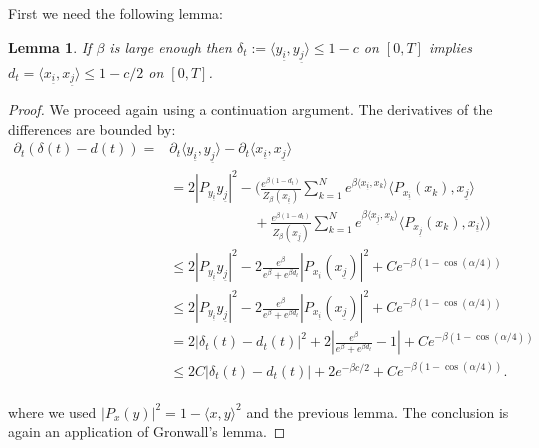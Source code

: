 \documentclass{article}
\numberwithin{theorem}{section}
\newtheorem{lemma}[theorem]{Lemma}
\begin{document}
First we need the following lemma:
\begin{lemma}
 If $\beta$ is large enough then $\delta_t:=\langle y_{\underline{i}},y_{\underline{j}}\rangle \leq 1-c$ on $[0,T]$ implies $d_t=\langle x_{\underline{i}},x_{\underline{j}}\rangle\leq  1-c/2$ on $[0,T]$.
\end{lemma}
\begin{proof}
We proceed again using a continuation argument. The derivatives of the differences are bounded by:
\begin{align*}
\partial_t (\delta(t) - d(t)) = &\partial_t \langle y_{\underline{i}},y_{\underline{j}}\rangle - \partial_t \langle x_{\underline{i}},x_{\underline{j}}\rangle \\
&=2|P_{y_{\underline{i}}}y_{\underline{j}}|^2 - \Big(\frac{e^{\beta(1-d_t)}}{Z_\beta(x_{\underline{i}})}\sum_{k=1}^N e^{\beta\langle x_{\underline{i}}, x_k\rangle}  \langle P_{x_{\underline{i}}}(x_k), x_{\underline{j}}\rangle \\
& \qquad \qquad \qquad + \frac{e^{\beta(1-d_t)}}{Z_\beta(x_{\underline{j}})}\sum_{k=1}^N e^{\beta\langle x_{\underline{j}}, x_k\rangle}  \langle P_{x_{\underline{j}}}(x_k), x_{\underline{i}}\rangle\Big) \\
&\leq 2|P_{y_{\underline{i}}}y_{\underline{j}}|^2 - 2\frac{e^\beta}{e^\beta + e^{\beta d_t}}|{P_{x_{\underline{i}}}}(x_{\underline{j}})|^2 + Ce^{-\beta(1-\cos(\alpha/4))} \\
&\leq 2|P_{y_{\underline{i}}}y_{\underline{j}}|^2 - 2\frac{e^\beta}{e^\beta + e^{\beta d_t}}|{P_{x_{\underline{i}}}}(x_{\underline{j}})|^2 + Ce^{-\beta(1-\cos(\alpha/4))} \\
&= 2|\delta_t(t)-d_t(t)|^2 + 2|\frac{e^\beta}{e^\beta + e^{\beta d_t}}-1|+ Ce^{-\beta(1-\cos(\alpha/4))} \\
&\leq 2C|\delta_t(t)-d_t(t)| + 2e^{-\beta c/2}+ Ce^{-\beta(1-\cos(\alpha/4))}.\\
\end{align*}

where we used $|P_x(y)|^2 = 1 - \langle x,y\rangle^2$ and the previous lemma. The conclusion is again an application of Gronwall's lemma.
\end{proof}
\end{document}
